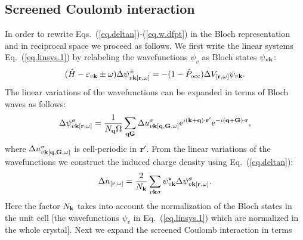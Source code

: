 \documentclass[twocolumn,prb,showpacs,superscriptaddress]{revtex4}
\def\s1{\hspace{0.5cm}}
\def\s2{\hspace{1cm}}
\def\w{\omega}
\def\H{\hat{H}}
\def\P{\hat{P}_{\rm occ}}
\def\E{\varepsilon}
\def\q{{\bf q}}
\def\s{\sigma}
\def\k{{\bf k}}
\def\G{{\bf G}}
\def\Gp{{\bf G^\prime}}
\def\r{{\bf r}}
\def\rp{{\bf r^\prime}}
\begin{document}

%
%
%

\subsection{Screened Coulomb interaction}\label{sec.coulomb.g}

In order to rewrite Eqs.\ (\ref{eq.deltan})-(\ref{eq.w.dfpt}) in
the Bloch representation and in reciprocal space we proceed as follows.
We first write the linear systems Eq.\ (\ref{eq.linsys.1})
by relabeling the wavefunctions $\psi_v$ as Bloch states $\psi_{v\k}$:
  \begin{equation}\label{eq.linsys.3}
  (\H-\E_{v\k}\pm\w) \Delta \psi^\pm_{v\k[\r,\w]}  = -(1-\P)  \Delta V_{[\r,\w]} \psi_{v\k}.
  \end{equation}
The linear variations of the wavefunctions can be expanded in terms
of Bloch waves as follows:
  \begin{equation}\label{eq123}
  \Delta \psi^\sigma_{v\k[\r,\w]} = \frac{1}{N_\q\Omega} \sum_{\q\G} \Delta u^\sigma_{v\k[\q,\G,\w]}
  {\rm e}^{i(\k+\q)\cdot\rp} {\rm e}^{-i(\q+\G)\cdot\r},
  \end{equation}
where $\Delta u^\sigma_{v\k[\q,\G,\w]}$ is cell-periodic in $\rp$.
From the linear variations of the wavefunctions we construct the
induced charge density using Eq.\ (\ref{eq.deltan}):
  \begin{equation}\label{eq.ch}
  \Delta n_{[\r,\w]} = \frac{2}{N_\k}\sum_{v\k\s} \psi_{v\k}^\star  \Delta \psi^\s_{v\k[\r,\w]}.
  \end{equation}
Here the factor $N_\k$ takes into account the normalization of
the Bloch states in the unit cell [the 
wavefunctions $\psi_v$ in Eq.\ (\ref{eq.linsys.1}) which are normalized 
in the whole crystal].
Next we expand the screened Coulomb interaction in terms
\end{document}

